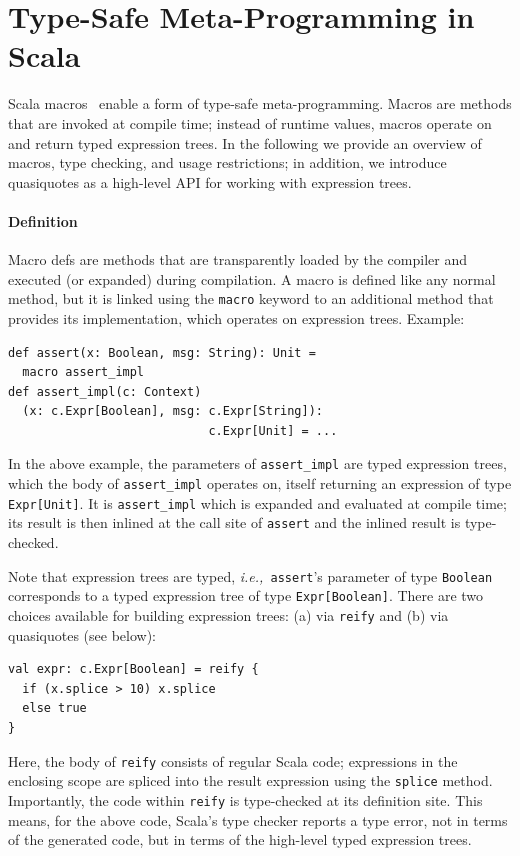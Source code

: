 \documentclass[preprint]{sigplanconf}
\newcommand{\ie}{{\em i.e.,~}}
\begin{document}
\section{Type-Safe Meta-Programming in Scala}
\label{sec:macros}

Scala macros~\cite{Burmako2012, Burmako2013} enable a form of type-safe
meta-programming. Macros are methods that are invoked at compile time; instead of
runtime values, macros operate on and return typed expression trees. In the
following we provide an overview of macros, type checking, and usage
restrictions; in addition, we introduce quasiquotes as a high-level API
for working with expression trees.

\paragraph{Definition} Macro defs are methods that are transparently loaded by
the compiler and executed (or expanded) during compilation. A macro is defined
like any normal method, but it is linked using the \verb|macro| keyword to an
additional method that provides its implementation, which operates on
expression trees. Example:
\begin{lstlisting}
def assert(x: Boolean, msg: String): Unit =
  macro assert_impl
def assert_impl(c: Context)
  (x: c.Expr[Boolean], msg: c.Expr[String]):
                            c.Expr[Unit] = ...
\end{lstlisting}
\noindent
In the above example, the parameters of \verb|assert_impl| are typed
expression trees, which the body of \verb|assert_impl| operates on, itself
returning an expression of type \verb|Expr[Unit]|. It is \verb|assert_impl|
which is expanded and evaluated at compile time; its result is then inlined at
the call site of \verb|assert| and the inlined result is type-checked.

Note that expression trees are typed, \ie \verb|assert|'s parameter of type
\verb|Boolean| corresponds to a typed expression tree of type
\verb|Expr[Boolean]|. There are two choices available for building expression
trees: (a) via \verb|reify| and (b) via quasiquotes (see below):
\begin{lstlisting}
val expr: c.Expr[Boolean] = reify {
  if (x.splice > 10) x.splice
  else true
}
\end{lstlisting}
\noindent
Here, the body of \verb|reify| consists of regular Scala code; expressions in
the enclosing scope are spliced into the result expression using the
\verb|splice| method. Importantly, the code within \verb|reify| is
type-checked at its definition site. This means, for the above code, Scala's type
checker reports a type error, not in terms of the generated code, but in terms
of the high-level typed expression trees.
\end{document}
